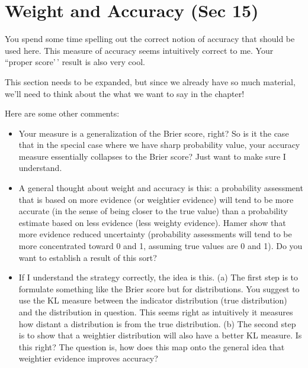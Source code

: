 \documentclass[
  10pt,
  dvipsnames,enabledeprecatedfontcommands]{scrartcl}
\begin{document}
\hypertarget{weight-and-accuracy-sec-15}{%
\section{Weight and Accuracy (Sec
15)}\label{weight-and-accuracy-sec-15}}

You spend some time spelling out the correct notion of accuracy that
should be used here. This measure of accuracy seems intuitively correct
to me. Your ``proper score'\,' result is also very cool.

This section needs to be expanded, but since we already have so much
material, we'll need to think about the what we want to say in the
chapter!

Here are some other comments:

\begin{itemize}


\item Your measure is a generalization of the Brier score, right? So is it the case that in the special case where we have sharp probability value, your accuracy measure essentially collapses to the Brier score? Just want to make sure I understand.

\item A general thought about weight and accuracy is this: a probability assessment that is based on more evidence (or weightier evidence) will tend to be more accurate (in the sense of being closer to the true value) than a probability estimate based on less evidence (less weighty evidence). Hamer show that more evidence reduced uncertainty (probability assessments will tend to be more concentrated toward 0 and 1, assuming true values are 0 and 1). Do you want to establish a result of this sort?

\item If I understand the strategy correctly, the idea is this. (a) The first step is to formulate something 
like the Brier score but for distributions. You suggest to use the KL measure between the indicator distribution (true distribution) and the distribution in question. This seems right as intuitively it measures how distant a distribution is from the true distribution. (b) The second step is to show that a weightier distribution will also have a better KL measure. Is this right? The question is, how does this map onto the general idea that weightier evidence improves accuracy?









\end{itemize}
\end{document}

